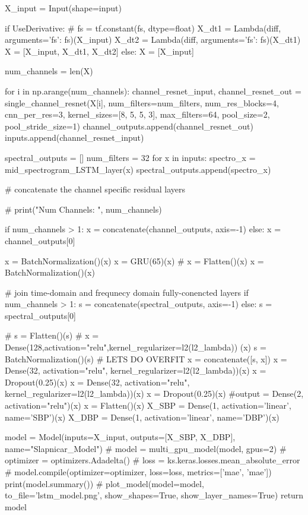 \begin{python}
    X_input = Input(shape=input)

    if UseDerivative:
        # fs = tf.constant(fs, dtype=float)
        X_dt1 = Lambda(diff, arguments={'fs': fs})(X_input)
        X_dt2 = Lambda(diff, arguments={'fs': fs})(X_dt1)
        X = [X_input, X_dt1, X_dt2]
    else:
        X = [X_input]

    num_channels = len(X)

    for i in np.arange(num_channels):
        channel_resnet_input, channel_resnet_out = single_channel_resnet(X[i], num_filters=num_filters,
        num_res_blocks=4, cnn_per_res=3, kernel_sizes=[8, 5, 5, 3], max_filters=64, pool_size=2, pool_stride_size=1)
        channel_outputs.append(channel_resnet_out)
        inputs.append(channel_resnet_input)

    spectral_outputs = []
    num_filters = 32
    for x in inputs:
        spectro_x = mid_spectrogram_LSTM_layer(x)
        spectral_outputs.append(spectro_x)

    # concatenate the channel specific residual layers

    # print("Num Channels: ", num_channels)

    if num_channels > 1:
        x = concatenate(channel_outputs, axis=-1)
    else:
        x = channel_outputs[0]

    x = BatchNormalization()(x)
    x = GRU(65)(x)
    # x = Flatten()(x)
    x = BatchNormalization()(x)

    # join time-domain and frequnecy domain fully-conencted layers
    if num_channels > 1:
        s = concatenate(spectral_outputs, axis=-1)
    else:
        s = spectral_outputs[0]

    # s = Flatten()(s)
    #     x = Dense(128,activation="relu",kernel_regularizer=l2(l2_lambda)) (x)
    s = BatchNormalization()(s)
    # LETS DO OVERFIT
    x = concatenate([s, x])
    x = Dense(32, activation="relu", kernel_regularizer=l2(l2_lambda))(x)
    x = Dropout(0.25)(x)
    x = Dense(32, activation="relu", kernel_regularizer=l2(l2_lambda))(x)
    x = Dropout(0.25)(x)
    #output = Dense(2, activation="relu")(x)
    x = Flatten()(x)
    X_SBP = Dense(1, activation='linear', name='SBP')(x)
    X_DBP = Dense(1, activation='linear', name='DBP')(x)

    model = Model(inputs=X_input, outputs=[X_SBP, X_DBP], name="Slapnicar_Model")
    # model = multi_gpu_model(model, gpus=2)
    # optimizer = optimizers.Adadelta()
    # loss = ks.keras.losses.mean_absolute_error
    # model.compile(optimizer=optimizer, loss=loss, metrics=['mae', 'mae'])
    print(model.summary())
    # plot_model(model=model, to_file='lstm_model.png', show_shapes=True, show_layer_names=True)
    return model



\end{python}

